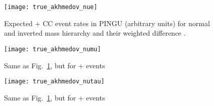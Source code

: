 \begin{figure}[p]
 \centering
 \texttt{[image: true\_akhmedov\_nue]}
 \caption{Expected \nue + \nuebar CC event rates in PINGU (arbitrary units) for
    normal and inverted mass hierarchy and their weighted difference \delchi.}
 \label{fig:true_akhmedov_nue}
\end{figure}
\begin{figure}[p]
 \centering
 \texttt{[image: true\_akhmedov\_numu]}
 \caption{Same as Fig.~\ref{fig:true_akhmedov_nue}, but for \numu + \numubar
    events}
 \label{fig:true_akhmedov_numu}
\end{figure}
\begin{figure}[p]
 \centering
 \texttt{[image: true\_akhmedov\_nutau]}
 \caption{Same as Fig.~\ref{fig:true_akhmedov_nue}, but for \nutau + \nutaubar
    events}
 \label{fig:true_akhmedov_nutau}
\end{figure}
